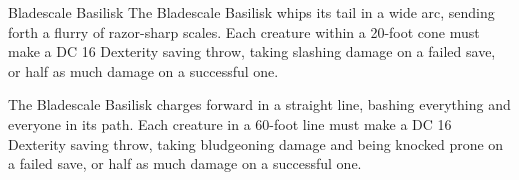 \documentclass[letterpaper,openany,twoside,twocolumn]{book}
\begin{document}
\begin{DndMonster}[width=0.5\textwidth +0.5em]{Bladescale Basilisk}
	The Bladescale Basilisk whips its tail in a wide arc, sending forth a flurry of razor-sharp scales. Each creature within a 20-foot cone must make a DC 16 Dexterity saving throw, taking  slashing damage on a failed save, or half as much damage on a successful one.

	The Bladescale Basilisk charges forward in a straight line, bashing everything and everyone in its path. Each creature in a 60-foot line must make a DC 16 Dexterity saving throw, taking  bludgeoning damage and being knocked prone on a failed save, or half as much damage on a successful one.
\end{DndMonster}

%
\end{document}
